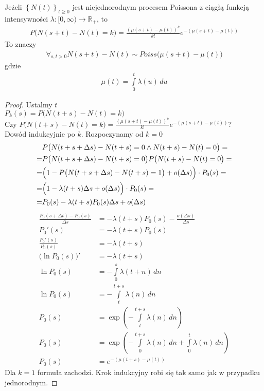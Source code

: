 \begin{twr}
Jeżeli $ \left\{N(t)\right\}_{t\ge 0} $ jest niejednorodnym procesem Poissona z ciągłą funkcją intensywności $ \lambda:[0,\infty )\to \mathbb R _+ $, to
\begin{gather*}
P\bigl(N(s+t)-N(t)=k\bigr)=\frac{(\mu(s+t)-\mu(t))^k}{k!}e^{-\left(\mu(s+t)-\mu(t)\right)}
\end{gather*}
To znaczy
\begin{gather*}
\forall_{s,t>0}N(s+t)-N(t)\sim Poiss\bigl(\mu(s+t)-\mu(t)\bigr)
\end{gather*}
gdzie
\begin{gather*}
\mu(t)=\int\limits_{0}^{t}\lambda(u)\,du
\end{gather*}
\begin{proof}
Ustalmy $ t $\\
$ P_k(s)=P\bigl(N(t+s)-N(t)=k\bigr) $\\
Czy $ P\bigl(N(t+s)-N(t)=k\bigr)=\frac{(\mu(s+t)-\mu(t))^k}{k!}e^{-\left(\mu(s+t)-\mu(t)\right)}$?\\
Dowód indukcyjnie po $ k $. Rozpoczynamy od $ k=0 $
\begin{align*}
&P\bigl(N(t+s+\Delta s)-N(t+s)=0\wedge N(t+s)-N(t)=0\bigr)
=\\=&
P\bigl(N(t+s+\Delta s)-N(t+s)=0\bigr)P\bigl( N(t+s)-N(t)=0\bigr)
=\\=&
\Bigl(1-P\bigl(N(t+s+\Delta s)-N(t+s)=1\bigr)+o(\Delta s)\Bigr)
\cdot P_0(s)
=\\=&
\Bigl(1-\lambda(t+s)\Delta s+o(\Delta s)\Bigr)
\cdot P_0(s)
=\\=&
P_0(s)-\lambda(t+s)P_0(s)\Delta s+o(\Delta s)
\end{align*}
\begin{align*}
\frac{P_0\left(s+\Delta t\right)-P_0(s)}{\Delta s}&=-\lambda(t+s)P_0(s)-\frac{o(\Delta s)}{\Delta s}\\
P_0'(s)&=-\lambda(t+s)P_0(s)\\
\frac{P_0'(s)}{P_0(s)}&=-\lambda(t+s)\\
\bigl(\ln P_0(s)\bigr)'&=-\lambda(t+s)\\
\ln P_0(s)&=-\int\limits_{0}^{s}\lambda(t+n)\,dn\\
\ln P_0(s)&=-\int\limits_{t}^{t+s}\lambda(n)\,dn\\
P_0(s)&=\exp \left(-\int\limits_{t}^{t+s}\lambda(n)\,dn\right)\\
P_0(s)&=\exp \left(-\int\limits_{0}^{t+s}\lambda(n)\,dn+\int\limits_{0}^{t}\lambda(n)\,dn\right)\\
P_0(s)&=e^{-\left(\mu(t+s)-\mu(t)\right)}
\end{align*}
Dla $ k=1 $ formuła zachodzi. Krok indukcyjny robi się tak samo jak w przypadku jednorodnym.
\end{proof}
\end{twr}
